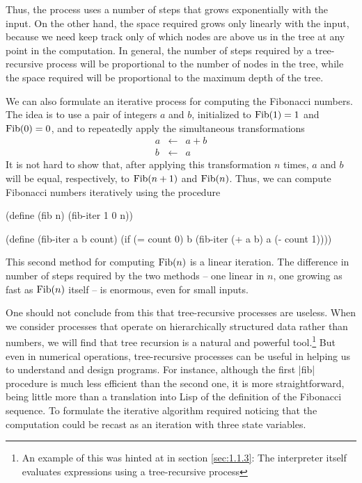 Thus, the process uses a number of steps that grows exponentially with
the input.  On the other hand, the space required grows only linearly
with the input, because we need keep track only of which nodes are
above us in the tree at any point in the computation.  In general, the
number of steps required by a tree-recursive process will be
proportional to the number of nodes in the tree, while the space
required will be proportional to the maximum depth of the tree.

We can also formulate an iterative process for computing the
Fibonacci numbers.  The idea is to use a pair of integers $a$ and
$b$, initialized to  ${\rm Fib}(1) = 1$ and ${\rm Fib}(0) = 0$,
and to repeatedly apply the simultaneous
transformations
\begin{eqnarray*}
a & \leftarrow & a + b \\
b & \leftarrow & a
\end{eqnarray*}
It is not hard to show that, after applying this transformation $n$
times, $a$ and $b$ will be equal, respectively, to ${\rm Fib}(n+1)$
and ${\rm Fib}(n)$.  Thus, we can compute Fibonacci numbers
iteratively using the procedure

\begin{schemedisplay}
(define (fib n)
  (fib-iter 1 0 n))

(define (fib-iter a b count)
  (if (= count 0)
      b
      (fib-iter (+ a b) a (- count 1))))
\end{schemedisplay}

This second method for computing ${\rm Fib}(n)$ is a linear iteration.
The difference in number of steps required by the two methods -- one
linear in $n$, one growing as fast as ${\rm Fib}(n)$ itself -- is
enormous, even for small inputs.

One should not conclude from this that tree-recursive processes are
useless.  When we consider processes that operate on hierarchically
structured data rather than numbers, we will find that tree recursion
is a natural and powerful tool.\footnote{An example of this was hinted
  at in section \ref{sec:1.1.3}: The interpreter itself evaluates
  expressions using a tree-recursive process} But even in numerical
operations, tree-recursive processes can be useful in helping us to
understand and design programs.  For instance, although the first
\scheme|fib| procedure is much less efficient than the second one, it
is more straightforward, being little more than a translation into
Lisp of the definition of the Fibonacci sequence.  To formulate the
iterative algorithm required noticing that the computation could be
recast as an iteration with three state variables.

